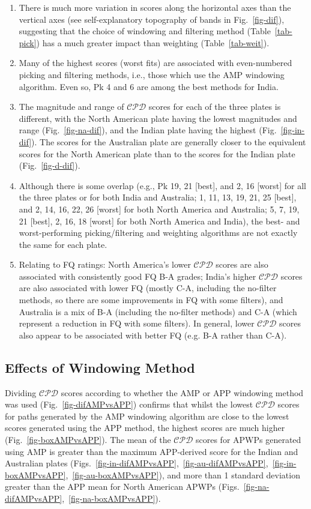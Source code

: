 \begin{enumerate}
  \item There is much more variation in scores along the horizontal axes than
	the vertical axes (see self-explanatory topography of bands in
	Fig.~\ref{fig-dif}), suggesting that the choice of windowing and filtering
	method (Table~\ref{tab-pick}) has a much greater impact than weighting
	(Table~\ref{tab-weit}).
  \item Many of the highest scores (worst fits) are associated with
	even-numbered picking and filtering methods, i.e., those which use the AMP
	windowing algorithm. Even so, Pk 4 and 6 are among the best methods for
	India.
  \item The magnitude and range of $\mathcal{CPD}$ scores for each of the three
	plates is different, with the North American plate having the lowest
	magnitudes and range (Fig.~\ref{fig-na-dif}), and the Indian plate having
	the highest (Fig.~\ref{fig-in-dif}). The scores for the Australian plate are
	generally closer to the equivalent scores for the North American plate than
	to the scores for the Indian plate (Fig.~\ref{fig-d-dif}).
  \item Although there is some overlap (e.g., Pk 19, 21 [best], and
	2, 16 [worst] for all the three plates or for both India and Australia; 1,
	11, 13, 19, 21, 25 [best], and 2, 14, 16, 22, 26 [worst] for both North
	America and Australia; 5, 7, 19, 21 [best], 2, 16, 18 [worst] for both North
	America and India), the best- and worst-performing picking/filtering and
	weighting algorithms are not exactly the same for each plate.
  \item Relating to FQ ratings: North America's lower $\mathcal{CPD}$ scores are
	also associated with consistently good FQ B-A grades; India's higher
	$\mathcal{CPD}$ scores are also associated with lower FQ (mostly C-A,
	including the no-filter methods, so there are some improvements in FQ with
	some filters), and Australia is a mix of B-A (including the no-filter
	methods) and C-A (which represent a reduction in FQ with some filters). In
	general, lower $\mathcal{CPD}$ scores also appear to be associated with
	better FQ (e.g. B-A rather than C-A).
\end{enumerate}

\subsection{Effects of Windowing Method}

Dividing $\mathcal{CPD}$ scores according to whether the AMP or APP windowing
method was used (Fig.~\ref{fig-difAMPvsAPP}) confirms that whilst the lowest
$\mathcal{CPD}$ scores for paths generated by the AMP windowing algorithm are
close to the lowest scores generated using the APP method, the highest scores
are much higher (Fig.~\ref{fig-boxAMPvsAPP}). The mean of the $\mathcal{CPD}$
scores for APWPs generated using AMP is greater than the maximum APP-derived
score for the Indian and Australian plates
(Figs.~\ref{fig-in-difAMPvsAPP},~\ref{fig-au-difAMPvsAPP},~\ref{fig-in-boxAMPvsAPP},~\ref{fig-au-boxAMPvsAPP}),
and more than 1 standard deviation greater than the APP mean for North American
APWPs (Figs.~\ref{fig-na-difAMPvsAPP},~\ref{fig-na-boxAMPvsAPP}).

